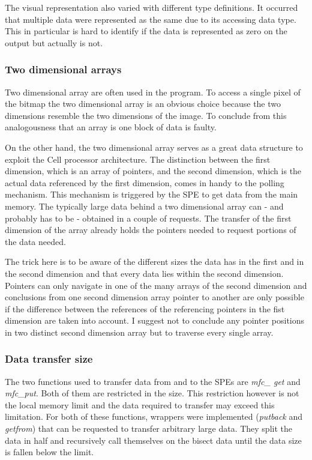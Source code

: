 The visual representation also varied with different type definitions. It occurred that multiple data were represented as the same due to its accessing data type. This in particular is hard to identify if the data is represented as zero on the output but actually is not.

\subsubsection{Two dimensional arrays}
\label{sec:2darray}
Two dimensional array are often used in the program. To access a single pixel of the bitmap the two dimensional array is an obvious choice because the two dimensions resemble the two dimensions of the image. To conclude from this analogousness that an array is one block of data is faulty.

On the other hand, the two dimensional array serves as a great data structure to exploit the Cell processor architecture. The distinction between the first dimension, which is an array of pointers, and the second dimension, which is the actual data referenced by the first dimension, comes in handy to the polling mechanism. This mechanism is triggered by the SPE to get data from the main memory. The typically large data behind a two dimensional array can - and probably has to be - obtained in a couple of requests. The transfer of the first dimension of the array already holds the pointers needed to request portions of the data needed.

The trick here is to be aware of the different sizes the data has in the first and in the second dimension and that every data lies within the second dimension. Pointers can only navigate in one of the many arrays of the second dimension and conclusions from one second dimension array pointer to another are only possible if the difference between the references of the referencing pointers in the fist dimension are taken into account. I suggest not to conclude any pointer positions in two distinct second dimension array but to traverse every single array. 

\subsubsection{Data transfer size}
The two functions used to transfer data from and to the SPEs are \emph{mfc\_ get} and \emph{mfc\_put}. Both of them are restricted in the size. This restriction however is not the local memory limit and the data required to transfer may exceed this limitation. For both of these functions, wrappers were implemented (\emph{putback} and \emph{getfrom}) that can be requested to transfer arbitrary large data. They split the data in half and recursively call themselves on the bisect data until the data size is fallen below the limit.

